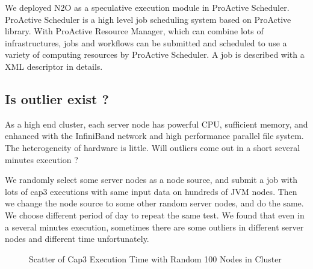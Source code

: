  We deployed N2O as a speculative execution module in ProActive Scheduler. ProActive Scheduler is a high level job scheduling system based on ProActive library. With ProActive Resource Manager, which can combine lots of infrastructures, jobs and workflows can be submitted and scheduled to use a variety of computing resources by ProActive Scheduler. A job is described with a XML descriptor in details.

\subsection{Is outlier exist ?}

As a high end cluster, each server node has powerful CPU, sufficient memory, and enhanced with the InfiniBand network and high performance parallel file system. The heterogeneity of hardware is little. Will outliers come out in a short several minutes execution ?

We randomly select some server nodes as a node source, and submit a job with lots of cap3 executions with same input data on hundreds of JVM nodes. Then we change the node source to some other random server nodes, and do the same. We choose different period of day to repeat the same test. We found that even in a several minutes execution, sometimes there are some outliers in different server nodes and different time unfortunately.

\begin{figure}
\centering
{}
\caption{Scatter of Cap3 Execution Time with Random 100 Nodes in Cluster}
\label{figure:outlier}
\end{figure}


